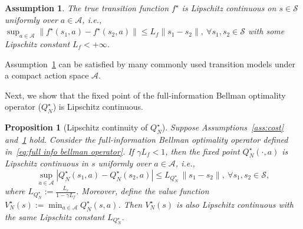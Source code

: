 \documentclass[letterpaper, 10 pt, conference]{ieeeconf}  %
\newtheorem{proposition}{Proposition}
\newtheorem{assumption}{Assumption}
\begin{document}
\begin{assumption}\label{ass:f star lip}
The true transition function $f^\star$ is Lipschitz continuous on $s \in \mathcal S$ uniformly over $a \in \mathcal A$, i.e., $\sup_{a \in \mathcal A} \|f^\star(s_1,a)-f^\star(s_2,a)\| \le L_f\|s_1-s_2\|,\ \forall s_1,s_2 \in \mathcal S$ with some Lipschitz constant $L_f < +\infty$.
\end{assumption}

Assumption\ \ref{ass:f star lip} can be satisfied by many commonly used transition models under a compact action space $\mathcal A$.

Next, we show that the fixed point of the full-information Bellman optimality operator ($Q_N^\star$) is Lipschitz continuous.
\begin{proposition}[Lipschitz continuity of $Q_N^\star$]\label{prop:QNs_lip}
Suppose Assumptions\ \ref{ass:cost} and\ \ref{ass:f star lip} hold. Consider the full-information Bellman optimality operator defined in\ \eqref{eq:full info bellman operator}. If $\gamma L_f<1$, then the fixed point $Q_N^\star(\cdot,a)$ is Lipschitz continuous in $s$ uniformly over $a\in\mathcal A$, i.e.,
\[
\sup_{a\in\mathcal A}|Q_N^\star(s_1,a)-Q_N^\star(s_2,a)|
\le L_{Q^\star_N}\,\|s_1-s_2\|,\ \forall s_1,s_2\in\mathcal S,
\]
where $L_{Q^\star_N}:=\frac{L_c}{1-\gamma L_f}$. Moreover, define the value function $V_N^\star(s):=\min_{a\in\mathcal A}Q_N^\star(s,a)$. Then $V_N^\star(s)$ is also Lipschitz continuous with the same Lipschitz constant $L_{Q^\star_N}$.
\end{proposition}
\end{document}
